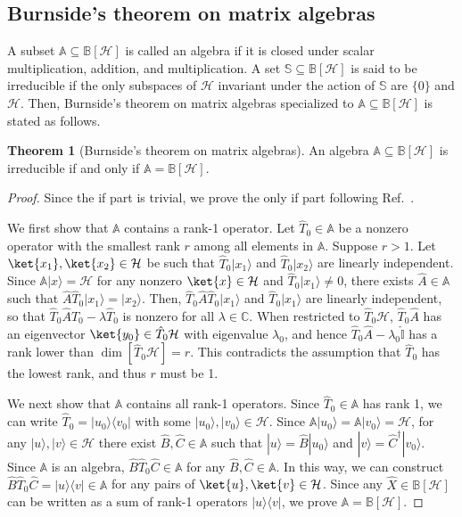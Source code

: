 \documentclass[preprint,pteplogo]{ptephy_v2}%
\numberwithin{equation}{section}
\theoremstyle{definition}
\newtheorem{theorem}{Theorem}
\newcommand{\mc}[1]{\mathcal{#1}}
\newcommand{\mbb}[1]{\mathbb{#1}}
\begin{document}
\subsection{Burnside's theorem on matrix algebras}
\label{app:BurnsideTheorem}

A subset $\mbb{A} \subseteq \mbb{B}[\mc{H}]$ is called an algebra if it is closed under scalar multiplication, addition, and multiplication.
A set $\mbb{S} \subseteq \mbb{B}[\mc{H}]$ is said to be irreducible if the only subspaces of $\mc{H}$ invariant under the action of $\mbb{S}$ are $\{0\}$ and $\mc{H}$.
Then, Burnside's theorem on matrix algebras specialized to $\mbb{A} \subseteq \mbb{B}[\mc{H}]$ is stated as follows.

\begin{theorem}[Burnside's theorem on matrix algebras]
An algebra $\mbb{A} \subseteq \mbb{B}[\mc{H}]$ is irreducible if and only if $\mbb{A} = \mbb{B}[\mc{H}]$.
\end{theorem}

\begin{proof}
Since the if part is trivial, we prove the only if part following Ref.~\cite{Halperin1980burnside}.

We first show that $\mbb{A}$ contains a rank-1 operator.
Let $\hat{T}_0 \in \mbb{A}$ be a nonzero operator with the smallest rank $r$ among all elements in $\mbb{A}$.
Suppose $r>1$. 
Let $\ket{x_1}, \ket{x_2} \in \mc{H}$ be such that $\hat{T}_0 | x_1 \rangle$ and $\hat{T}_0 | x_2 \rangle$ are linearly independent.
Since $\mbb{A} | x \rangle = \mc{H}$ for any nonzero $\ket{x} \in \mc{H}$ and $\hat{T}_0 | x_1 \rangle \neq 0$, there exists $\hat{A} \in \mbb{A}$ such that $\hat{A} \hat{T}_0 | x_1 \rangle = | x_2 \rangle$.
Then, $\hat{T}_0 \hat{A} \hat{T}_0 | x_1 \rangle$ and $\hat{T}_0 | x_1 \rangle$ are linearly independent, so that $\hat{T}_0 \hat{A} \hat{T}_0 - \lambda \hat{T}_0$ is nonzero for all $\lambda \in \mbb{C}$.
When restricted to $\hat{T}_0 \mc{H}$, $\hat{T}_0 \hat{A}$ has an eigenvector $\ket{y_0} \in \hat{T}_0 \mc{H}$ with eigenvalue $\lambda_0$, and hence $\hat{T}_0 \hat{A} -\lambda_0 \hat{\mbb{I}}$ has a rank lower than $\dim [\hat{T}_0 \mc{H}] = r$.
This contradicts the assumption that $\hat{T}_0$ has the lowest rank, and thus $r$ must be 1.

We next show that $\mbb{A}$ contains all rank-1 operators.
Since $\hat{T}_0 \in \mbb{A}$ has rank 1, we can write $\hat{T}_0 = | u_0 \rangle \langle v_0 |$ with some $| u_0 \rangle, | v_0 \rangle \in \mc{H}$.
Since $\mbb{A} | u_0 \rangle = \mbb{A} | v_0 \rangle = \mc{H}$, for any $| u \rangle, | v \rangle \in \mc{H}$ there exist $\hat{B}, \hat{C} \in \mbb{A}$ such that $| u \rangle = \hat{B} | u_0 \rangle$ and $| v \rangle = \hat{C}^\dagger | v_0 \rangle$. 
Since $\mbb{A}$ is an algebra, $\hat{B} \hat{T}_0 \hat{C} \in \mbb{A}$ for any $\hat{B}, \hat{C} \in \mbb{A}$.
In this way, we can construct $\hat{B} \hat{T}_0 \hat{C} = | u \rangle \langle v | \in \mbb{A}$ for any pairs of $\ket{u}, \ket{v} \in \mc{H}$.
Since any $\hat{X} \in \mbb{B}[\mc{H}]$ can be written as a sum of rank-1 operators $| u \rangle \langle v |$, we prove $\mbb{A} = \mbb{B}[\mc{H}]$.
\end{proof}
\end{document}
